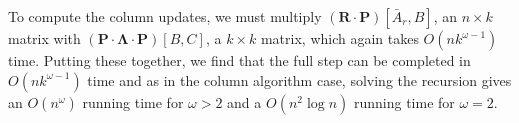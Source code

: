 \documentclass[10pt,a4paper]{article}
\newcommand{\matsize}[2]{#1\times #2}
\newcommand{\matexp}{\omega}
\newcommand{\mat}[1]{\mathbf{#1}}
\newcommand{\Remark}[1]{\textcolor{blue}{[#1]}}
\begin{document}
To compute the column updates, 
we must multiply $(\mat{R}\cdot\mat{P})[\bar{A}_r,B]$, an $\matsize{n}{k}$ matrix with  $(\mat{P} \cdot \mat{\Lambda} \cdot \mat{P})[B,C]$, a $\matsize{k}{k}$ matrix, which again takes $O(nk^{\matexp-1})$ time. 
%
Putting these together, we find that the full step can be completed in  $O(nk^{\matexp-1})$ time and as in the column algorithm case, solving the recursion  gives an  $O(n^{\matexp})$ running time for $\matexp>2$ and  a  $O(n^2\log n )$ running time for $\matexp=2$. %


\end{document}
